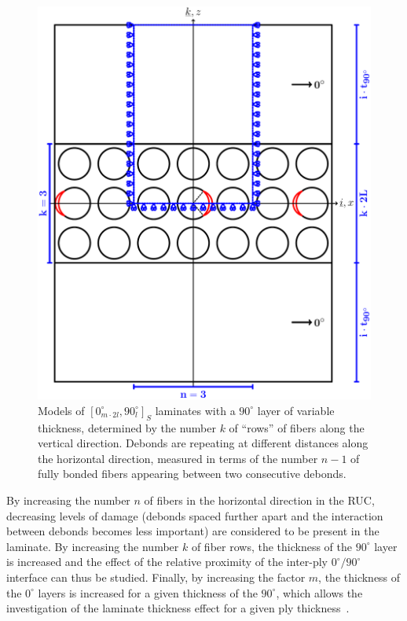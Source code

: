 \documentclass[review]{elsarticle}
\begin{document}
\begin{figure}[!h]
\centering
        \includegraphics[width=\textwidth]{ThickPly.pdf}
\caption{Models of $\left[0_{m\cdot2l}^{\circ},90_{l}^{\circ}\right]_{S}$ laminates with a $90^{\circ}$ layer of variable thickness, determined by the number $k$ of ``rows'' of fibers along the vertical direction.  Debonds are repeating at different distances along the horizontal direction, measured in terms of the number $n-1$ of fully bonded fibers appearing between two consecutive debonds.}\label{fig:laminateModelsB}
\end{figure}

By increasing the number $n$ of fibers in the horizontal direction in the RUC, decreasing levels of damage (debonds spaced further apart and the interaction between debonds becomes less important) are considered to be present in the laminate. By increasing the number $k$ of fiber rows, the thickness of the $90^{\circ}$ layer is increased and the effect of the relative proximity of the inter-ply $0^{\circ}/90^{\circ}$ interface can thus be studied. Finally, by increasing the factor $m$, the thickness of the $0^{\circ}$ layers is increased for a given thickness of the $90^{\circ}$, which allows the investigation of the laminate thickness effect for a given ply thickness~\cite{Frossard2016}.
\end{document}

